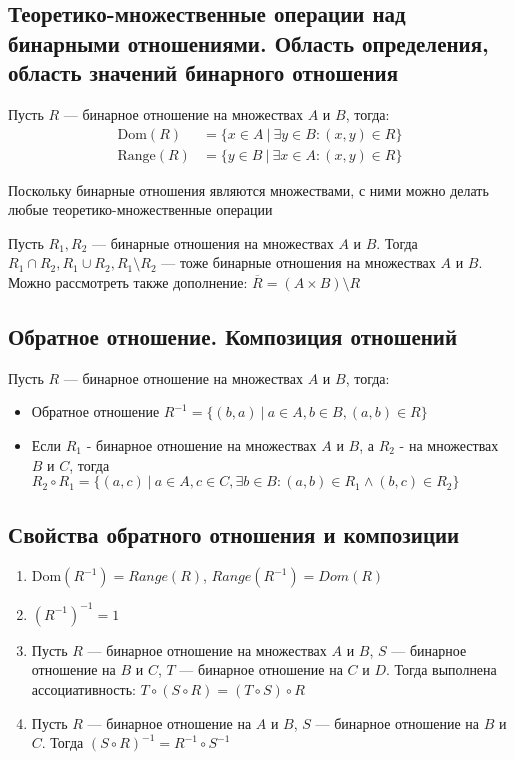\documentclass[a4paper]{article}
\begin{document}
\subsection{Теоретико-множественные операции над бинарными отношениями. Область определения, область значений бинарного отношения}
Пусть $R$ — бинарное отношение на множествах $A$ и $B$, тогда:
\begin{equation*}
    \begin{aligned}
        \text{Dom}(R)&=\{x\in A\ |\ \exists y\in B: (x,y)\in R\}\\
        \text{Range}(R)&=\{y\in B\ |\ \exists x\in A: (x,y)\in R\}
    \end{aligned}
\end{equation*}

Поскольку бинарные отношения являются множествами, с ними можно делать любые теоретико-множественные операции

Пусть $R_1, R_2$ — бинарные отношения на множествах $A$ и $B$. Тогда $R_1\cap R_2, R_1\cup R_2, R_1\setminus R_2$ — тоже бинарные отношения на множествах $A$ и $B$. Можно рассмотреть также дополнение: $\overline{R}=(A\times B)\setminus R$

\subsection{Обратное отношение. Композиция отношений}
\label{sec:binary}
Пусть $R$ — бинарное отношение на множествах $A$ и $B$, тогда:
\begin{itemize}
    \item Обратное отношение $R^{-1}=\{(b,a)\ |\ a\in A, b\in B, (a,b)\in R\}$
    \item Если $R_1$ - бинарное отношение на множествах $A$ и $B$, а $R_2$ - на множествах $B$ и $C$, тогда $R_2\circ R_1=\{(a,c)\ |\ a\in A, c\in C, \exists b\in B: (a,b)\in R_1\wedge(b,c)\in R_2\}$
\end{itemize}

\subsection{Свойства обратного отношения и композиции}
\begin{enumerate}
    \item Dom$(R^{-1})=Range(R)$, $Range(R^{-1})=Dom(R)$
    \item $(R^{-1})^{-1}=1$
    \item Пусть $R$ — бинарное отношение на множествах $A$ и $B$, $S$ — бинарное отношение на $B$ и $C$, $T$ — бинарное отношение на $C$ и $D$. Тогда выполнена ассоциативность: $T\circ(S\circ R)=(T\circ S)\circ R$
    \item Пусть $R$ — бинарное отношение на $A$ и $B$, $S$ — бинарное отношение на  $B$ и $C$. Тогда $(S\circ R)^{-1}=R^{-1}\circ S^{-1}$
\end{enumerate}
\end{document}
